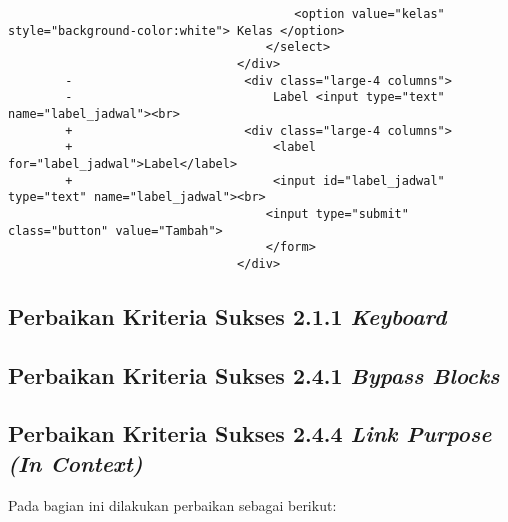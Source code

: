 \begin{itemize}
\begin{lstlisting}
                                        <option value="kelas" style="background-color:white"> Kelas </option>
                                    </select>
                                </div>
        -                        <div class="large-4 columns">
        -                            Label <input type="text" name="label_jadwal"><br>
        +                        <div class="large-4 columns">   
        +                            <label for="label_jadwal">Label</label>
        +                            <input id="label_jadwal" type="text" name="label_jadwal"><br>
                                    <input type="submit" class="button" value="Tambah">
                                    </form>
                                </div>
    \end{lstlisting}
\end{itemize}

\subsection{Perbaikan Kriteria Sukses 2.1.1 \textit{Keyboard}}
\label{subsec:perbaikan_kriteria_sukses_2.1.1}

\subsection{Perbaikan Kriteria Sukses 2.4.1 \textit{Bypass Blocks}}
\label{subsec:perbaikan_kriteria_sukses_2.4.1}

\subsection{Perbaikan Kriteria Sukses 2.4.4 \textit{Link Purpose (In Context)}}
\label{subsec:perbaikan_kriteria_sukses_2.4.4}
Pada bagian ini dilakukan perbaikan sebagai berikut:

